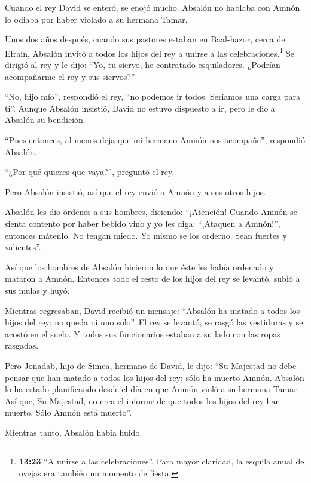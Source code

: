  Cuando el rey David se enteró, se enojó mucho.
 Absalón no hablaba con Amnón lo odiaba por haber violado a
su hermana Tamar.

 Unos dos años después, cuando sus pastores estaban en
Baal-hazor, cerca de Efraín, Absalón invitó a todos los hijos del rey a
unirse a las celebraciones.\footnote{\textbf{13:23} ``A unirse a las
  celebraciones''. Para mayor claridad, la esquila anual de ovejas era
  también un momento de fiesta.}  Se dirigió al rey y le
dijo: ``Yo, tu siervo, he contratado esquiladores. ¿Podrían acompañarme
el rey y sus siervos?''

 ``No, hijo mío'', respondió el rey, ``no podemos ir todos.
Seríamos una carga para ti''. Aunque Absalón insistió, David no estuvo
dispuesto a ir, pero le dio a Absalón su bendición.

 ``Pues entonces, al menos deja que mi hermano Amnón nos
acompañe'', respondió Absalón.

``¿Por qué quieres que vaya?'', preguntó el rey.

 Pero Absalón insistió, así que el rey envió a Amnón y a
sus otros hijos.

 Absalón les dio órdenes a sus hombres, diciendo:
``¡Atención! Cuando Amnón se sienta contento por haber bebido vino y yo
les diga: ``¡Ataquen a Amnón!'', entonces mátenlo. No tengan miedo. Yo
mismo se los orderno. Sean fuertes y valientes''.

 Así que los hombres de Absalón hicieron lo que éste les
había ordenado y mataron a Amnón. Entonces todo el resto de los hijos
del rey se levantó, subió a sus mulas y huyó.

 Mientras regresaban, David recibió un mensaje: ``Absalón
ha matado a todos los hijos del rey; no queda ni uno solo''.
 El rey se levantó, se rasgó las vestiduras y se acostó en
el suelo. Y todos sus funcionarios estaban a su lado con las ropas
rasgadas.

 Pero Jonadab, hijo de Simea, hermano de David, le dijo:
``Su Majestad no debe pensar que han matado a todos los hijos del rey;
sólo ha muerto Amnón. Absalón lo ha estado planificando desde el día en
que Amnón violó a su hermana Tamar.  Así que, Su Majestad,
no crea el informe de que todos los hijos del rey han muerto. Sólo Amnón
está muerto''.

 Mientras tanto, Absalón había huido.

